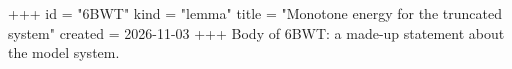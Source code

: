 +++
id = "6BWT"
kind = "lemma"
title = "Monotone energy for the truncated system"
created = 2026-11-03
+++
Body of 6BWT: a made-up statement about the model system.
